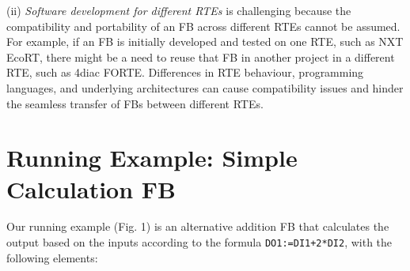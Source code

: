 \documentclass[conference]{IEEEtran}
\begin{document}
(ii) \emph{Software development for different RTEs} is challenging because the compatibility and portability of an FB across different RTEs cannot be assumed. 
For example, if an FB is initially developed and tested on one RTE, such as NXT EcoRT, there might be a need to reuse that FB in another project in a different RTE, such as 4diac FORTE. Differences in RTE behaviour, programming languages, and underlying architectures can cause compatibility issues and hinder the seamless transfer of FBs between different RTEs. 

\section{Running Example: Simple Calculation FB}
Our running example (Fig. 1) is an alternative addition FB that calculates the output based on the inputs according to the formula \texttt{DO1:=DI1+2*DI2}, with the following elements:
\end{document}
